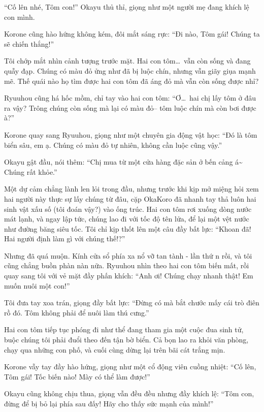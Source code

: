 \documentclass[../main.tex]{subfiles}
\begin{document}
``Cố lên nhé, Tôm con!'' Okayu thủ thỉ, giọng như một người mẹ đang khích lệ con mình.

Korone cũng hào hứng không kém, đôi mắt sáng rực: ``Đi nào, Tôm gái! Chúng ta sẽ chiến thắng!''


Tôi chớp mắt nhìn cảnh tượng trước mặt. Hai con tôm\dots\ vẫn còn sống và đang quẫy đạp. Chúng có màu đỏ ửng như đã bị luộc chín, nhưng vẫn giãy giụa mạnh mẽ. Thế quái nào họ tìm được hai con tôm đã áng đỏ mà vẫn còn sống được nhỉ?

Ryuuhou cũng há hốc mồm, chỉ tay vào hai con tôm: ``Ơ\dots\ hai chị lấy tôm ở đâu ra vậy? Trông chúng còn sống mà lại có màu đỏ-- tôm luộc chín mà còn bơi được à?''

Korone quay sang Ryuuhou, giọng như một chuyên gia động vật học: ``Đó là tôm biển sâu, em ạ. Chúng có màu đỏ tự nhiên, không cần luộc cũng vậy.''

Okayu gật đầu, nói thêm: ``Chị mua từ một cửa hàng đặc sản ở bến cảng á\~{} Chúng rất khỏe.''

Một dự cảm chẳng lành len lỏi trong đầu, nhưng trước khi kịp mở miệng hỏi xem hai người này thực sự lấy chúng từ đâu, cặp OkaKoro đã nhanh tay thả luôn hai sinh vật xấu số (tôi đoán vậy?) vào ống trúc. Hai con tôm rơi xuống dòng nước mát lạnh, và ngay lập tức, chúng lao đi với tốc độ tên lửa, để lại một vệt nước như đường băng siêu tốc. Tôi chỉ kịp thốt lên một câu đầy bất lực: ``Khoan đã! Hai người định làm gì với chúng thế!?''

Nhưng đã quá muộn. Kính cửa sổ phía xa nổ vỡ tan tành - lần thứ n rồi, và tôi cũng chẳng buồn phàn nàn nữa. Ryuuhou nhìn theo hai con tôm biến mất, rồi quay sang tôi với vẻ mặt đầy phấn khích: ``Anh ơi! Chúng chạy nhanh thật! Em muốn nuôi một con!''

Tôi đưa tay xoa trán, giọng đầy bất lực: ``Đừng có mà bắt chước mấy cái trò điên rồ đó. Tôm không phải để nuôi làm thú cưng.''

Hai con tôm tiếp tục phóng đi như thể đang tham gia một cuộc đua sinh tử, buộc chúng tôi phải đuổi theo đến tận bờ biển. Cả bọn lao ra khỏi văn phòng, chạy qua những con phố, và cuối cùng dừng lại trên bãi cát trắng mịn.

Korone vẫy tay đầy hào hứng, giọng như một cổ động viên cuồng nhiệt: ``Cố lên, Tôm gái! Tốc biến nào! Mày có thể làm được!''

Okayu cũng không chịu thua, giọng vẫn đều đều nhưng đầy khích lệ: ``Tôm con, đừng để bị bỏ lại phía sau đấy! Hãy cho thấy sức mạnh của mình!''
\end{document}

